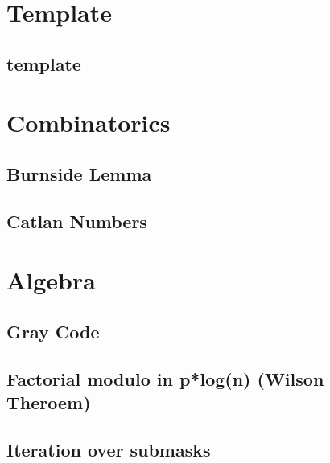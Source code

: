 \section{Template}
\subsection{template}
\vspace{-2.2ex}
\raggedbottom
\vspace{-3.2ex}
\hrulefill

\section{Combinatorics}
\subsection{Burnside Lemma}
\vspace{-2.2ex}
\raggedbottom
\vspace{-3.2ex}
\hrulefill
\subsection{Catlan Numbers}
\vspace{-2.2ex}
\raggedbottom
\vspace{-3.2ex}
\hrulefill

\section{Algebra}
\subsection{Gray Code}
\vspace{-2.2ex}
\raggedbottom
\vspace{-3.2ex}
\hrulefill
\subsection{Factorial modulo in p*log(n) (Wilson Theroem)}
\vspace{-2.2ex}
\raggedbottom
\vspace{-3.2ex}
\hrulefill
\subsection{Iteration over submasks}
\vspace{-2.2ex}
\raggedbottom
\vspace{-3.2ex}
\hrulefill
